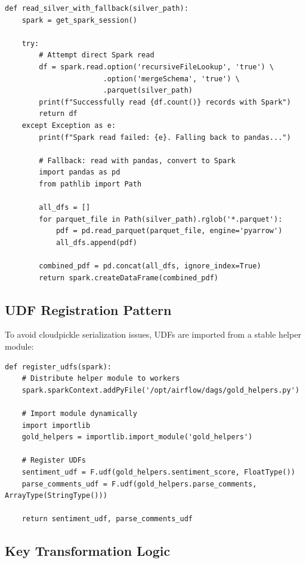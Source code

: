 \documentclass[12pt]{article}
\begin{document}
\begin{lstlisting}[caption=Resilient Silver Reader]
def read_silver_with_fallback(silver_path):
    spark = get_spark_session()
    
    try:
        # Attempt direct Spark read
        df = spark.read.option('recursiveFileLookup', 'true') \
                       .option('mergeSchema', 'true') \
                       .parquet(silver_path)
        print(f"Successfully read {df.count()} records with Spark")
        return df
    except Exception as e:
        print(f"Spark read failed: {e}. Falling back to pandas...")
        
        # Fallback: read with pandas, convert to Spark
        import pandas as pd
        from pathlib import Path
        
        all_dfs = []
        for parquet_file in Path(silver_path).rglob('*.parquet'):
            pdf = pd.read_parquet(parquet_file, engine='pyarrow')
            all_dfs.append(pdf)
        
        combined_pdf = pd.concat(all_dfs, ignore_index=True)
        return spark.createDataFrame(combined_pdf)
\end{lstlisting}

\subsection{UDF Registration Pattern}

To avoid cloudpickle serialization issues, UDFs are imported from a stable helper module:

\begin{lstlisting}
def register_udfs(spark):
    # Distribute helper module to workers
    spark.sparkContext.addPyFile('/opt/airflow/dags/gold_helpers.py')
    
    # Import module dynamically
    import importlib
    gold_helpers = importlib.import_module('gold_helpers')
    
    # Register UDFs
    sentiment_udf = F.udf(gold_helpers.sentiment_score, FloatType())
    parse_comments_udf = F.udf(gold_helpers.parse_comments, ArrayType(StringType()))
    
    return sentiment_udf, parse_comments_udf
\end{lstlisting}

\subsection{Key Transformation Logic}
\end{document}
